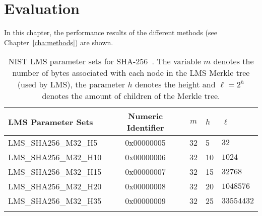 \chapter{Evaluation} %
\label{cha:results}

In this chapter, the performance results of the different methods (see Chapter~\ref{cha:methods}) are shown.

\begin{table}
\centering
\begin{tabular}{l c c l l} 
 \hline\noalign{\smallskip}
 \textbf{LMS Parameter Sets} & \textbf{Numeric Identifier} & \textbf{$m$} & \textbf{$h$} & $\ell$ \\
 \hline\noalign{\smallskip}
 LMS\_SHA256\_M32\_H5 & 0x00000005  & 32 & 5 & $32$ \\
 LMS\_SHA256\_M32\_H10 & 0x00000006  & 32 & 10 & $1024$ \\
 LMS\_SHA256\_M32\_H15 & 0x00000007  & 32 & 15 & $32768$ \\
 LMS\_SHA256\_M32\_H20 & 0x00000008  & 32 & 20 & $1048576$ \\
 LMS\_SHA256\_M32\_H35 & 0x00000009  & 32 & 25 & $33554432$ \\
 \hline\noalign{\smallskip}
 \end{tabular}
\caption{NIST LMS parameter sets for SHA-256~\cite{stateful_hashbased_sign_schemes_NIST_2020}. The variable $m$ denotes the number of bytes associated with each node in the LMS Merkle tree (used by LMS), the parameter $h$ denotes the height and $\ell = 2^h$ denotes the amount of children of the Merkle tree.} %
\label{table:nist_param_lms}
\end{table}

